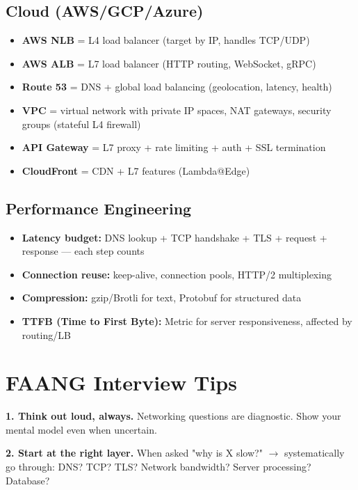 \documentclass[11pt]{article}
\providecommand{\tightlist}{\setlength{\itemsep}{1pt}\setlength{\parskip}{0pt}}
\begin{document}
\subsection{Cloud (AWS/GCP/Azure)}\label{cloud-awsgcpazure}

\begin{itemize}
\tightlist
\item
  \textbf{AWS NLB} = L4 load balancer (target by IP, handles TCP/UDP)
\item
  \textbf{AWS ALB} = L7 load balancer (HTTP routing, WebSocket, gRPC)
\item
  \textbf{Route 53} = DNS + global load balancing (geolocation, latency, health)
\item
  \textbf{VPC} = virtual network with private IP spaces, NAT gateways, security groups (stateful L4 firewall)
\item
  \textbf{API Gateway} = L7 proxy + rate limiting + auth + SSL termination
\item
  \textbf{CloudFront} = CDN + L7 features (Lambda@Edge)
\end{itemize}

\subsection{Performance Engineering}\label{performance-engineering}

\begin{itemize}
\tightlist
\item
  \textbf{Latency budget:} DNS lookup + TCP handshake + TLS + request + response --- each step counts
\item
  \textbf{Connection reuse:} keep-alive, connection pools, HTTP/2 multiplexing
\item
  \textbf{Compression:} gzip/Brotli for text, Protobuf for structured data
\item
  \textbf{TTFB (Time to First Byte):} Metric for server responsiveness, affected by routing/LB
\end{itemize}

\section{FAANG Interview Tips}\label{faang-interview-tips}

\textbf{1. Think out loud, always.} Networking questions are diagnostic. Show your mental model even when uncertain.

\textbf{2. Start at the right layer.} When asked "why is X slow?" \(\rightarrow\) systematically go through: DNS? TCP? TLS? Network bandwidth? Server processing? Database?
\end{document}
